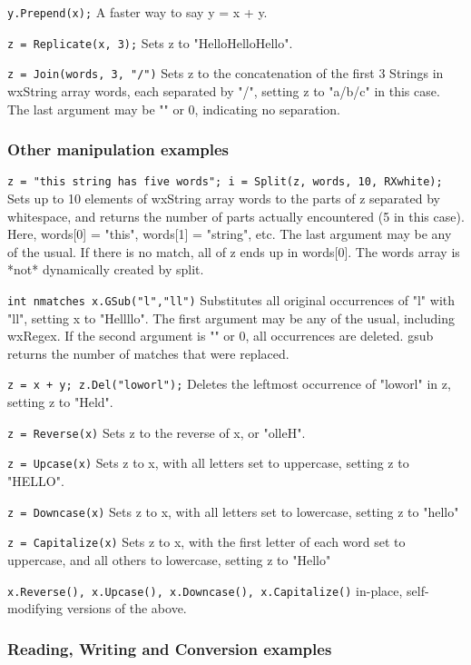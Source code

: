{\tt y.Prepend(x);} 
A faster way to say y = x + y.

{\tt z = Replicate(x, 3);} 
Sets z to "HelloHelloHello".

{\tt z = Join(words, 3, "/")} 
Sets z to the concatenation of the first 3 Strings in wxString array
words, each separated by "/", setting z to "a/b/c" in this case.
The last argument may be "" or 0, indicating no separation.

\subsubsection{Other manipulation examples}

{\tt z = "this string has five words"; i = Split(z, words, 10, RXwhite);} 
Sets up to 10 elements of wxString array words to the parts of z
separated by whitespace, and returns the number of parts actually
encountered (5 in this case). Here, words[0] = "this", words[1] =
"string", etc.  The last argument may be any of the usual.  If
there is no match, all of z ends up in words[0]. The words array
is *not* dynamically created by split.

{\tt int nmatches x.GSub("l","ll")} 
Substitutes all original occurrences of "l" with "ll", setting x
to "Hellllo". The first argument may be any of the usual,
including wxRegex.  If the second argument is "" or 0, all
occurrences are deleted. gsub returns the number of matches that
were replaced.

{\tt z = x + y;  z.Del("loworl");} 
Deletes the leftmost occurrence of "loworl" in z, setting z to
"Held".

{\tt z = Reverse(x)} 
Sets z to the reverse of x, or "olleH".

{\tt z = Upcase(x)} 
Sets z to x, with all letters set to uppercase, setting z to
"HELLO".

{\tt z = Downcase(x)} 
Sets z to x, with all letters set to lowercase, setting z to
"hello"

{\tt z = Capitalize(x)} 
Sets z to x, with the first letter of each word set to uppercase,
and all others to lowercase, setting z to "Hello"

{\tt x.Reverse(), x.Upcase(), x.Downcase(), x.Capitalize()} 
in-place, self-modifying versions of the above.

\subsubsection{Reading, Writing and Conversion examples}

